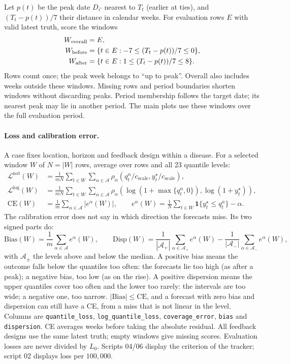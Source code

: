\documentclass[11pt,a4paper]{article}
\newcommand{\A}{\mathcal{A}}
\newcommand{\ind}{\mathbf{1}}
\theoremstyle{definition}
\theoremstyle{remark}
\begin{document}
Let $p(t)$ be the peak date $D_{i'}$ nearest to $T_t$ (earlier at ties),
and $(T_t-p(t))/7$ their distance in calendar weeks.
For evaluation rows $E$ with valid latest truth, score the windows
\begin{align}
 W_{\mathrm{overall}}&=E,\notag\\
 W_{\mathrm{before}}&=\{t\in E:-7\le (T_t-p(t))/7\le0\},\notag\\
 W_{\mathrm{after}}&=\{t\in E:1\le (T_t-p(t))/7\le8\}.
 \label{eq:evaluation-windows}
\end{align}
Rows count once; the peak week belongs to ``up to peak''. Overall also
includes weeks outside these windows. Missing rows and period boundaries
shorten windows without discarding peaks. Period membership follows the
target date; its nearest peak may lie in another period. The main plots
use these windows over the full evaluation period.

\paragraph{Loss and calibration error.}
A case fixes location, horizon and feedback design within a disease.
For a selected window $W$ of $N=|W|$ rows, average over rows and all
23 quantile levels:
\begin{align}
 \mathcal L^{\mathrm{nat}}(W)
 &=\frac1{mN}\sum_{t\in W}\sum_{\alpha\in\A}
 \rho_\alpha(q_t^\alpha/c_{\mathrm{scale}},y_t^\star/c_{\mathrm{scale}}),
 \label{eq:evaluation-natural}\\
 \mathcal L^{\log}(W)
 &=\frac1{mN}\sum_{t\in W}\sum_{\alpha\in\A}
 \rho_\alpha\!\left(\log(1+\max\{q_t^\alpha,0\}),\log(1+y_t^\star)\right),
 \label{eq:evaluation-log}\\
 \mathrm{CE}(W)
 &=\frac1m\sum_{\alpha\in\A}\bigl|e^\alpha(W)\bigr|,\qquad
 e^\alpha(W)=\frac1N\sum_{t\in W}\ind\{y_t^\star\le q_t^\alpha\}-\alpha.
 \label{eq:evaluation-ce}
\end{align}
The calibration error does not say in which direction the forecasts miss.
Its two signed parts do:
\begin{equation}
 \mathrm{Bias}(W)=\frac1m\sum_{\alpha\in\A}e^\alpha(W),\qquad
 \mathrm{Disp}(W)=\frac{1}{|\A_+|}\sum_{\alpha\in\A_+}e^\alpha(W)
  -\frac{1}{|\A_-|}\sum_{\alpha\in\A_-}e^\alpha(W),
 \label{eq:evaluation-bias}
\end{equation}
with $\A_\pm$ the levels above and below the median. A positive bias
means the outcome falls below the quantiles too often: the forecasts lie
too high (as after a peak); a negative bias, too low (as on the rise). A
positive dispersion means the upper quantiles cover too often and the
lower too rarely: the intervals are too wide; a negative one, too narrow.
$|\mathrm{Bias}|\le\mathrm{CE}$, and a forecast with zero bias and
dispersion can still have a CE, from a miss that is not linear in the
level. Columns are \texttt{quantile\_loss}, \texttt{log\_quantile\_loss},
\texttt{coverage\_error}, \texttt{bias} and \texttt{dispersion}. CE averages weeks before taking the absolute
residual. All feedback designs use the same latest truth; empty windows
give missing scores. Evaluation losses are never divided by $L_0$.
Scripts 04/06 display the criterion of the tracker; script 02 displays
loss per $100{,}000$.
\end{document}
